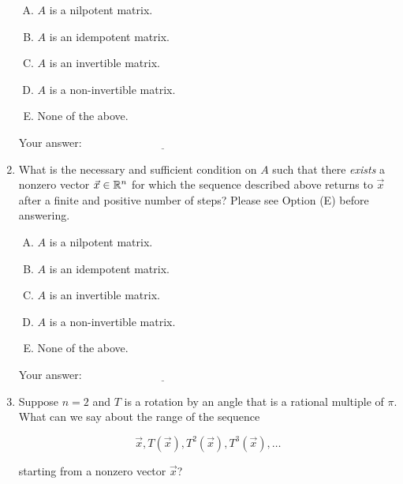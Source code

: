 \documentclass[10pt]{amsart}
\begin{document}
\begin{enumerate}
  \begin{enumerate}[(A)]
  \item $A$ is a nilpotent matrix.
  \item $A$ is an idempotent matrix.
  \item $A$ is an invertible matrix.
  \item $A$ is a non-invertible matrix.
  \item None of the above.
  \end{enumerate}

  \vspace{0.1in}
  Your answer: $\underline{\qquad\qquad\qquad\qquad\qquad\qquad\qquad}$
  \vspace{0.1in}

\item What is the necessary and sufficient condition on $A$ such that
  there {\em exists} a nonzero vector $\vec{x} \in \mathbb{R}^n$ for which the
  sequence described above returns to $\vec{x}$ after a finite and
  positive number of steps? Please see Option (E) before answering.

  \begin{enumerate}[(A)]
  \item $A$ is a nilpotent matrix.
  \item $A$ is an idempotent matrix.
  \item $A$ is an invertible matrix.
  \item $A$ is a non-invertible matrix.
  \item None of the above.
  \end{enumerate}

  \vspace{0.1in}
  Your answer: $\underline{\qquad\qquad\qquad\qquad\qquad\qquad\qquad}$
  \vspace{0.1in}

\item Suppose $n = 2$ and $T$ is a rotation by an angle that is a
  rational multiple of $\pi$. What can we say about the range of
  the sequence

  $$\vec{x}, T(\vec{x}), T^2(\vec{x}), T^3(\vec{x}), \dots$$

  starting from a nonzero vector $\vec{x}$?


\end{enumerate}
\end{document}
